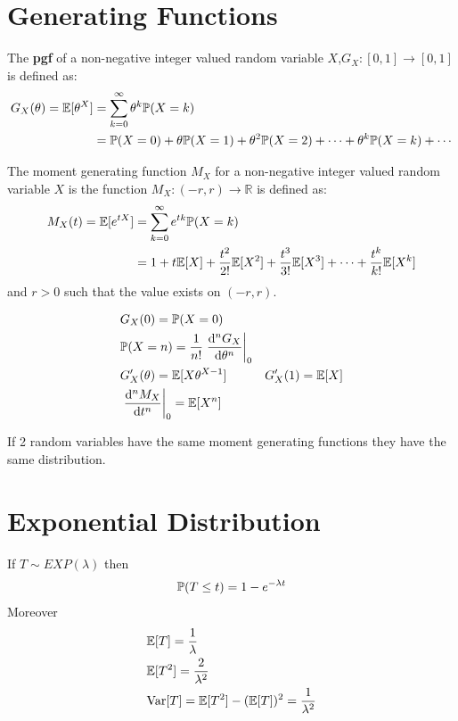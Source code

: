 \documentclass[12pt,a4paper]{article}
\begin{document}
\section{Generating Functions}
\begin{defn}
    The \textbf{pgf} of a non-negative integer valued  random variable $X$,$G_X: [0,1] \to [0,1]$ is defined as:
    \begin{align*}
        G_X(\theta) = \E[\theta^X] &= \nsum{k=0}{\infty}\theta^k \P(X = k)\\
        &= \P(X = 0) + \theta \P(X = 1) + \theta^2\P(X = 2) + \cdots + \theta^k\P(X = k) + \cdots
    \end{align*} 
\end{defn}
\begin{defn}
    The moment generating function $M_X$ for a non-negative integer valued  random variable $X$ is the function $M_X: (-r, r) \to \mathbb{R}$ is defined as:
    \begin{align*}
        M_X(t) = \E[e^{tX}] &= \nsum{k=0}{\infty}e^{tk}\P(X = k)\\
        &= 1 + t\E[X] + \frac{t^2}{2!}\E[X^2] + \frac{t^3}{3!}\E[X^3] + \cdots + \frac{t^k}{k!}\E[X^k]
    \end{align*}
    and $r>0$ such that the value exists on $(-r,r)$.
\end{defn}

\begin{thm}
    \begin{align*}
        &G_X(0) = \P(X = 0)\\
        &\P(X = n) = \frac{1}{n!}\left.\dv[n]{G_X}{\theta}\right\vert_0\\
        &G'_X(\theta) = \E[X\theta^{X-1}] & G'_X(1) = \E[X]\\
        &\left.\dv[n]{M_X}{t}\right\vert_0 = \E[X^n]
    \end{align*}
\end{thm}

\begin{lemma}
    If 2 random variables have the same moment generating functions they have the same distribution. 
\end{lemma}

\newpage
\section{Exponential Distribution}
\begin{defn}
    If $T \sim EXP(\lambda)$ then 
    \begin{align*}
        \P(T\leq t) = 1-e^{-\lambda t}
    \end{align*}
    Moreover 
    \begin{align*}
        &\E[T] = \frac{1}{\lambda}\\
        &\E[T^2] = \frac{2}{\lambda^2}\\
        &\Var[T] = \E[T^2] - (\E[T])^2 = \frac{1}{\lambda^2}
    \end{align*}
\end{defn}
\end{document}
